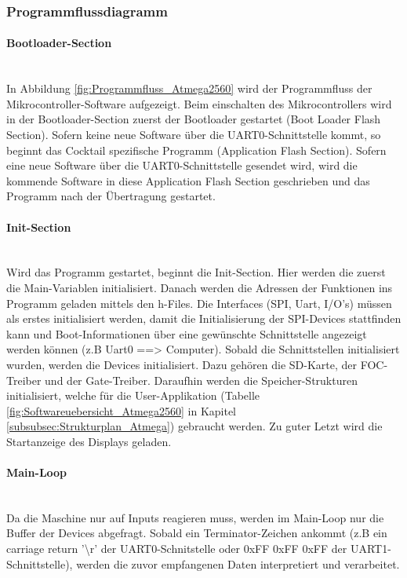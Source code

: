 \subsubsection{Programmflussdiagramm}
\label{subsubsec:Programmflussdiagramm}

\paragraph{Bootloader-Section}\mbox{}\\
In Abbildung \ref{fig:Programmfluss_Atmega2560} wird der Programmfluss der Mikrocontroller-Software aufgezeigt. Beim einschalten des Mikrocontrollers wird in der Bootloader-Section zuerst der Bootloader gestartet (Boot Loader Flash Section). Sofern keine neue Software über die UART0-Schnittstelle kommt, so beginnt das Cocktail spezifische Programm (Application Flash Section). Sofern eine neue Software über die UART0-Schnittstelle gesendet wird, wird die kommende Software in diese Application Flash Section geschrieben und das Programm nach der Übertragung gestartet.

\paragraph{Init-Section}\mbox{}\\
Wird das Programm gestartet, beginnt die Init-Section. Hier werden die zuerst die Main-Variablen initialisiert. Danach werden die Adressen der Funktionen ins Programm geladen mittels den h-Files. Die Interfaces (SPI, Uart, I/O's) müssen als erstes initialisiert werden, damit die Initialisierung der SPI-Devices stattfinden kann und Boot-Informationen über eine gewünschte Schnittstelle angezeigt werden können (z.B Uart0 ==> Computer). Sobald die Schnittstellen initialisiert wurden, werden die Devices initialisiert. Dazu gehören die SD-Karte, der FOC-Treiber und der Gate-Treiber. Daraufhin werden die Speicher-Strukturen initialisiert, welche für die User-Applikation (Tabelle \ref{fig:Softwareuebersicht_Atmega2560} in Kapitel \ref{subsubsec:Strukturplan_Atmega}) gebraucht werden. Zu guter Letzt wird die Startanzeige des Displays geladen.

\paragraph{Main-Loop}\mbox{}\\
Da die Maschine nur auf Inputs reagieren muss, werden im Main-Loop nur die Buffer der Devices abgefragt. Sobald ein Terminator-Zeichen ankommt (z.B ein carriage return '\textbackslash r' der UART0-Schnitstelle oder 0xFF 0xFF 0xFF der UART1-Schnittstelle), werden die zuvor empfangenen Daten interpretiert und verarbeitet.


